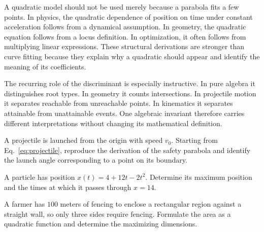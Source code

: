 A quadratic model should not be used merely because a parabola fits a few points. In physics, the quadratic dependence of position on time under constant acceleration follows from a dynamical assumption. In geometry, the quadratic equation follows from a locus definition. In optimization, it often follows from multiplying linear expressions. These structural derivations are stronger than curve fitting because they explain why a quadratic should appear and identify the meaning of its coefficients.

The recurring role of the discriminant is especially instructive. In pure algebra it distinguishes root types. In geometry it counts intersections. In projectile motion it separates reachable from unreachable points. In kinematics it separates attainable from unattainable events. One algebraic invariant therefore carries different interpretations without changing its mathematical definition.

\begin{exercise}
A projectile is launched from the origin with speed $v_0$. Starting from Eq.~\eqref{eq:projectile}, reproduce the derivation of the safety parabola and identify the launch angle corresponding to a point on its boundary.
\end{exercise}

\begin{exercise}
A particle has position $x(t)=4+12t-2t^2$. Determine its maximum position and the times at which it passes through $x=14$.
\end{exercise}

\begin{exercise}
A farmer has $100$ meters of fencing to enclose a rectangular region against a straight wall, so only three sides require fencing. Formulate the area as a quadratic function and determine the maximizing dimensions.
\end{exercise}
